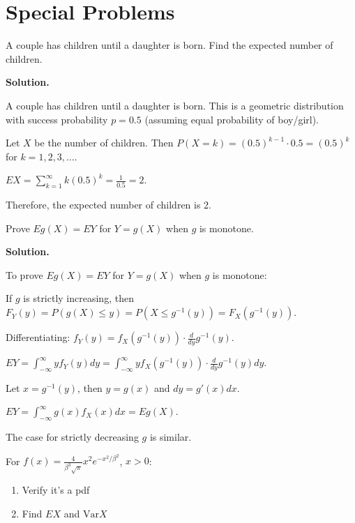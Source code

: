 \section{Special Problems}

\begin{problembox}
A couple has children until a daughter is born. Find the expected number of children.
\end{problembox}

\noindent\textbf{Solution.}

A couple has children until a daughter is born. This is a geometric distribution with success probability $p = 0.5$ (assuming equal probability of boy/girl).

Let $X$ be the number of children. Then $P(X = k) = (0.5)^{k-1} \cdot 0.5 = (0.5)^k$ for $k = 1, 2, 3, \ldots$.

$EX = \sum_{k=1}^\infty k(0.5)^k = \frac{1}{0.5} = 2$.

Therefore, the expected number of children is 2.

\begin{problembox}
Prove $Eg(X)=EY$ for $Y=g(X)$ when $g$ is monotone.
\end{problembox}

\noindent\textbf{Solution.}

To prove $Eg(X)=EY$ for $Y=g(X)$ when $g$ is monotone:

If $g$ is strictly increasing, then $F_Y(y) = P(g(X) \leq y) = P(X \leq g^{-1}(y)) = F_X(g^{-1}(y))$.

Differentiating: $f_Y(y) = f_X(g^{-1}(y)) \cdot \frac{d}{dy}g^{-1}(y)$.

$EY = \int_{-\infty}^{\infty} y f_Y(y)dy = \int_{-\infty}^{\infty} y f_X(g^{-1}(y)) \cdot \frac{d}{dy}g^{-1}(y)dy$.

Let $x = g^{-1}(y)$, then $y = g(x)$ and $dy = g'(x)dx$.

$EY = \int_{-\infty}^{\infty} g(x) f_X(x)dx = Eg(X)$.

The case for strictly decreasing $g$ is similar.

\begin{problembox}
For $f(x)=\frac{4}{\beta^3\sqrt{\pi}}x^2e^{-x^2/\beta^2}$, $x>0$:
\begin{enumerate}[label=(\alph*)]
    \item Verify it's a pdf
    \item Find $EX$ and $\text{Var}X$
\end{enumerate}
\end{problembox}

